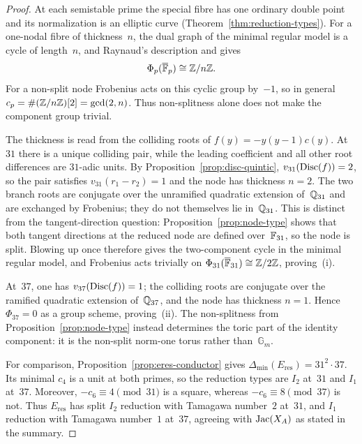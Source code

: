 \begin{proof}
At each semistable prime the special fibre has one ordinary double point and its normalization is an elliptic curve (Theorem~\ref{thm:reduction-types}). For a one-nodal fibre of thickness~\(n\), the dual graph of the minimal regular model is a cycle of length~\(n\), and Raynaud's description \cite[Chapter~10]{BoschLutkebohmertRaynaud1990} and \cite[Chapter~10]{Liu2002} gives
\[
\Phi_p(\overline{\mathbb{F}}_p)\cong\mathbb{Z}/n\mathbb{Z}.
\]
For a non-split node Frobenius acts on this cyclic group by~\(-1\), so in general \(c_p=\#(\mathbb{Z}/n\mathbb{Z})[2]=\gcd(2,n)\). Thus non-splitness alone does not make the component group trivial.

The thickness is read from the colliding roots of \(f(y)=-y(y-1)c(y)\). At~\(31\) there is a unique colliding pair, while the leading coefficient and all other root differences are \(31\)-adic units. By Proposition~\ref{prop:disc-quintic}, \(v_{31}(\operatorname{Disc}(f))=2\), so the pair satisfies \(v_{31}(r_1-r_2)=1\) and the node has thickness \(n=2\). The two branch roots are conjugate over the unramified quadratic extension of~\(\mathbb{Q}_{31}\) and are exchanged by Frobenius; they do not themselves lie in~\(\mathbb{Q}_{31}\). This is distinct from the tangent-direction question: Proposition~\ref{prop:node-type} shows that both tangent directions at the reduced node are defined over~\(\mathbb{F}_{31}\), so the node is split. Blowing up once therefore gives the two-component cycle in the minimal regular model, and Frobenius acts trivially on \(\Phi_{31}(\overline{\mathbb{F}}_{31})\cong\mathbb{Z}/2\mathbb{Z}\), proving~(i).

At~\(37\), one has \(v_{37}(\operatorname{Disc}(f))=1\); the colliding roots are conjugate over the ramified quadratic extension of~\(\mathbb{Q}_{37}\), and the node has thickness \(n=1\). Hence \(\Phi_{37}=0\) as a group scheme, proving~(ii). The non-splitness from Proposition~\ref{prop:node-type} instead determines the toric part of the identity component: it is the non-split norm-one torus rather than~\(\mathbb G_m\).

For comparison, Proposition~\ref{prop:eres-conductor} gives \(\Delta_{\min}(E_{\mathrm{res}})=31^2\cdot37\). Its minimal \(c_4\) is a unit at both primes, so the reduction types are \(I_2\) at~\(31\) and \(I_1\) at~\(37\). Moreover, \(-c_6\equiv4\pmod{31}\) is a square, whereas \(-c_6\equiv8\pmod{37}\) is not. Thus \(E_{\mathrm{res}}\) has split \(I_2\) reduction with Tamagawa number~\(2\) at~\(31\), and \(I_1\) reduction with Tamagawa number~\(1\) at~\(37\), agreeing with \(\operatorname{Jac}(X_A)\) as stated in the summary.
\end{proof}

